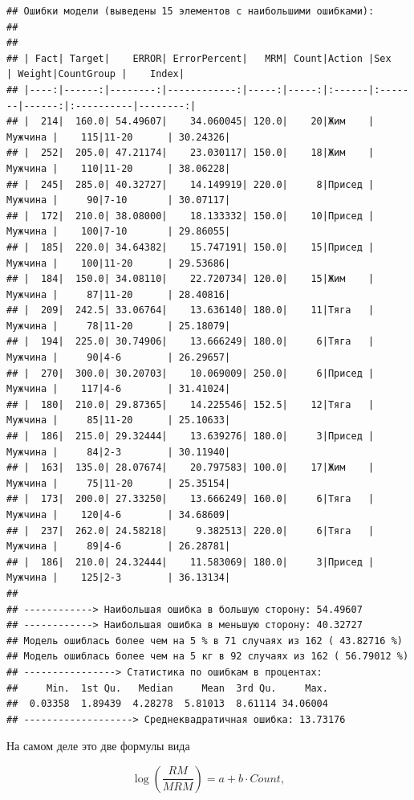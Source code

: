 \documentclass[
]{article}
\begin{document}
\begin{verbatim}
## Ошибки модели (выведены 15 элементов с наибольшими ошибками): 
## 
## 
## | Fact| Target|    ERROR| ErrorPercent|   MRM| Count|Action |Sex     | Weight|CountGroup |    Index|
## |----:|------:|--------:|------------:|-----:|-----:|:------|:-------|------:|:----------|--------:|
## |  214|  160.0| 54.49607|    34.060045| 120.0|    20|Жим    |Мужчина |    115|11-20      | 30.24326|
## |  252|  205.0| 47.21174|    23.030117| 150.0|    18|Жим    |Мужчина |    110|11-20      | 38.06228|
## |  245|  285.0| 40.32727|    14.149919| 220.0|     8|Присед |Мужчина |     90|7-10       | 30.07117|
## |  172|  210.0| 38.08000|    18.133332| 150.0|    10|Присед |Мужчина |    100|7-10       | 29.86055|
## |  185|  220.0| 34.64382|    15.747191| 150.0|    15|Присед |Мужчина |    100|11-20      | 29.53686|
## |  184|  150.0| 34.08110|    22.720734| 120.0|    15|Жим    |Мужчина |     87|11-20      | 28.40816|
## |  209|  242.5| 33.06764|    13.636140| 180.0|    11|Тяга   |Мужчина |     78|11-20      | 25.18079|
## |  194|  225.0| 30.74906|    13.666249| 180.0|     6|Тяга   |Мужчина |     90|4-6        | 26.29657|
## |  270|  300.0| 30.20703|    10.069009| 250.0|     6|Присед |Мужчина |    117|4-6        | 31.41024|
## |  180|  210.0| 29.87365|    14.225546| 152.5|    12|Тяга   |Мужчина |     85|11-20      | 25.10633|
## |  186|  215.0| 29.32444|    13.639276| 180.0|     3|Присед |Мужчина |     84|2-3        | 30.11940|
## |  163|  135.0| 28.07674|    20.797583| 100.0|    17|Жим    |Мужчина |     75|11-20      | 25.35154|
## |  173|  200.0| 27.33250|    13.666249| 160.0|     6|Тяга   |Мужчина |    120|4-6        | 34.68609|
## |  237|  262.0| 24.58218|     9.382513| 220.0|     6|Тяга   |Мужчина |     89|4-6        | 26.28781|
## |  186|  210.0| 24.32444|    11.583069| 180.0|     3|Присед |Мужчина |    125|2-3        | 36.13134|
## 
## ------------> Наибольшая ошибка в большую сторону: 54.49607 
## ------------> Наибольшая ошибка в меньшую сторону: 40.32727 
## Модель ошиблась более чем на 5 % в 71 случаях из 162 ( 43.82716 %)
## Модель ошиблась более чем на 5 кг в 92 случаях из 162 ( 56.79012 %)
## ----------------> Статистика по ошибкам в процентах:
##     Min.  1st Qu.   Median     Mean  3rd Qu.     Max. 
##  0.03358  1.89439  4.28278  5.81013  8.61114 34.06004 
## -------------------> Среднеквадратичная ошибка: 13.73176
\end{verbatim}

На самом деле это две формулы вида

\[\log \left(\frac{RM}{MRM}\right)= a+b \cdot Count,\]
\end{document}
